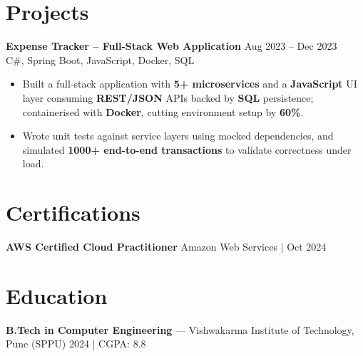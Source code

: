 \documentclass[10pt,letterpaper]{article}
\newcommand{\resumeSubheading}[4]{%
  \textbf{#1} \hfill #2 \\
  #3 \hfill #4 \\
}
\begin{document}
\section*{Projects}

\resumeSubheading{Expense Tracker -- Full-Stack Web Application}{Aug 2023 -- Dec 2023}{}{C\#, Spring Boot, JavaScript, Docker, SQL}
\begin{itemize}
    \item Built a full-stack application with \textbf{5+ microservices} and a \textbf{JavaScript} UI layer consuming \textbf{REST/JSON} APIs backed by \textbf{SQL} persistence; containerised with \textbf{Docker}, cutting environment setup by \textbf{60\%}.
    \item Wrote unit tests against service layers using mocked dependencies, and simulated \textbf{1000+ end-to-end transactions} to validate correctness under load.
\end{itemize}

\section*{Certifications}
\textbf{AWS Certified Cloud Practitioner} \hfill Amazon Web Services \;|\; Oct 2024

\section*{Education}
\textbf{B.Tech in Computer Engineering} --- Vishwakarma Institute of Technology, Pune (SPPU) \hfill 2024 \;|\; CGPA: 8.8
\end{document}
